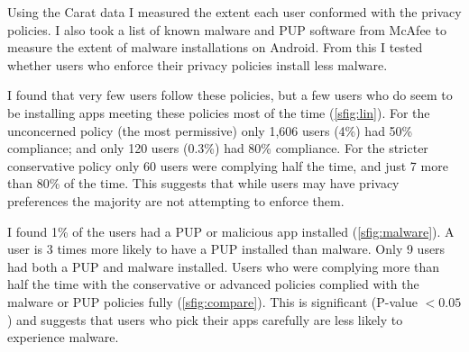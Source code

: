 \documentclass[a4paper]{scrartcl}
\begin{document}
Using the Carat data I measured the extent each user conformed with the privacy policies.
I also took a list of known malware and \ac{PUP} software from McAfee to measure the extent of malware installations on Android.
From this I tested whether users who enforce their privacy policies install less malware.

I found that very few users follow these policies, but a few users who do seem to be installing apps meeting these policies most of the time (\autoref{sfig:lin}).
For the unconcerned policy (the most permissive) only 1,606 users (4\%) had 50\% compliance;
and only 120 users (0.3\%) had 80\% compliance.
For the stricter conservative policy only 60 users were complying half the time, and just 7 more than 80\% of the time.
This suggests that while users may have privacy preferences the majority are not attempting to enforce them.

I found 1\% of the users had a PUP or malicious app installed (\autoref{sfig:malware}).
A user is 3 times more likely to have a PUP installed than malware.
Only 9 users had both a PUP and malware installed.
Users who were complying more than half the time with the conservative or advanced policies complied with the malware or PUP policies fully (\autoref{sfig:compare}).
This is significant (P-value $< 0.05$) and suggests that users who pick their apps carefully are less likely to experience malware.
\end{document}
